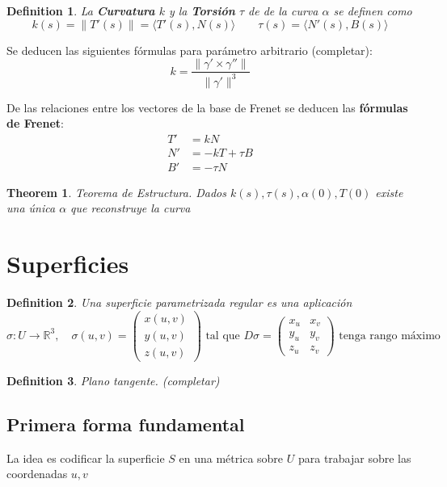 \documentclass[leqno]{article}
\newtheorem*{definition}{Definition}
\newtheorem*{theorem}{Theorem}
\begin{document}
\begin{definition}
La \textbf{Curvatura} $k$ y la \textbf{Torsión} $\tau $ de de la curva $\alpha$ se definen como
 \[
k(s) = \|T'(s)\|= \langle T'(s) , N(s) \rangle   \qquad  \tau(s) = \langle N'(s) , B(s) \rangle 
\] 
\end{definition}
Se deducen las siguientes fórmulas para parámetro arbitrario (completar):
 \[
k = \frac{\|\gamma' \times \gamma''\|}{\|\gamma'\|^3}
\] 

De las relaciones entre los vectores de la base de Frenet se deducen las \textbf{fórmulas de Frenet}:
\begin{align*}
  T' &= kN \\
  N' &= -kT + \tau B \\
  B' &= -\tau N 
\end{align*}

\begin{theorem}
Teorema de Estructura. Dados $k(s), \tau (s), \alpha(0), T(0)$ existe una única $\alpha$ que reconstruye la curva
\end{theorem}


\section{Superficies}
\begin{definition}
Una \textit{superficie parametrizada regular} es una aplicación
\[
  \sigma : U \to \mathbb{R}^3, \quad \sigma(u, v) = \begin{pmatrix} x(u, v) \\ y(u, v) \\ z(u, v) \end{pmatrix} \text{ tal que } D\sigma = \begin{pmatrix} x_u & x_v \\ y_u & y_v \\ z_u & z_v \end{pmatrix}  \text{ tenga rango máximo} 
\] 
\end{definition}

\begin{definition}
Plano tangente. (completar)
\end{definition}

\subsection{Primera forma fundamental}
La idea es codificar la superficie $S$ en una métrica sobre  $U$ para trabajar sobre las coordenadas  $u, v$
\end{document}
